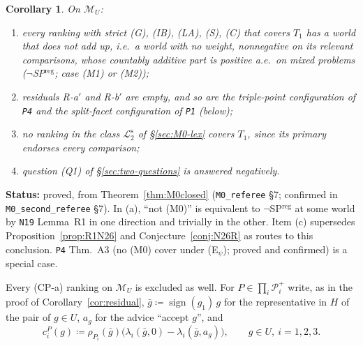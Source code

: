 \documentclass[11pt]{article}
\newtheorem{corollary}[theorem]{Corollary}
\theoremstyle{definition}
\theoremstyle{remark}
\newcommand{\M}{\mathcal M}
\newcommand{\src}[1]{\texttt{#1}}
\newcommand{\status}[1]{\par\smallskip\noindent\textbf{Status:} #1\par\smallskip}
\newcommand{\Ltwo}{\mathcal L_2^{\mathrm s}}
\begin{document}
\begin{corollary}\label{cor:M0closed}
On $\M_U$:
\begin{enumerate}[leftmargin=*,label=(\alph*)]
\item every ranking with strict (G), (IB), (LA), (S), (C) that covers $T_1$ has a world that does not add up, i.e.\ a world with no weight, nonnegative on its relevant comparisons, whose countably additive part is positive a.e.\ on mixed problems ($\neg$SP$^{\mathrm{reg}}$; case (M1) or (M2));
\item residuals R-a$'$ and R-b$'$ are empty, and so are the triple-point configuration of \src{P4} and the split-facet configuration of \src{P1} (below);
\item no ranking in the class $\Ltwo$ of \S\ref{sec:M0-lex} covers $T_1$, since its primary endorses every comparison;
\item question (Q1) of \S\ref{sec:two-questions} is answered negatively.
\end{enumerate}
\end{corollary}
\status{proved, from Theorem~\ref{thm:M0closed} (\src{M0\_referee} \S7; confirmed in \src{M0\_second\_referee} \S7). In (a), ``not (M0)'' is equivalent to $\neg$SP$^{\mathrm{reg}}$ at some world by \src{N19} Lemma~R1 in one direction and trivially in the other. Item (c) supersedes Proposition~\ref{prop:R1N26} and Conjecture~\ref{conj:N26R} as routes to this conclusion. \src{P4} Thm.~A3 (no (M0) cover under (E$_\psi$); proved and confirmed) is a special case.}

Every (CP-a) ranking on $\M_U$ is excluded as well. For $P\in\prod_i\mathcal P^+_i$ write, as in the proof of Corollary~\ref{cor:residual}, $\bar g\coloneqq\operatorname{sign}(g_1)\,g$ for the representative in $H$ of the pair of $g\in U$, $a_g$ for the advice ``accept $g$'', and
\[
c^P_i(g)\coloneqq\rho_{P_i}(\bar g)\bigl(\lambda_i(\bar g,0)-\lambda_i(\bar g,a_g)\bigr),\qquad g\in U,\ i=1,2,3 .
\]
\end{document}
